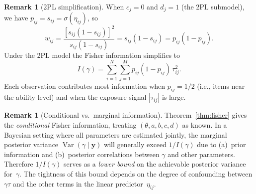 \documentclass[11pt,a4paper]{article}
\theoremstyle{definition}
\newtheorem{remark}[theorem]{Remark}
\DeclareMathOperator{\Var}{Var}
\begin{document}
\begin{remark}[2PL simplification]\label{rem:2pl}
When $c_j = 0$ and $d_j = 1$ (the 2PL submodel), we have
$p_{ij} = s_{ij} = \sigma(\eta_{ij})$, so
\begin{equation}\label{eq:w_2pl}
  w_{ij}
  = \frac{[s_{ij}(1-s_{ij})]^2}{s_{ij}(1-s_{ij})}
  = s_{ij}(1-s_{ij})
  = p_{ij}(1-p_{ij}).
\end{equation}
Under the 2PL model the Fisher information simplifies to
\begin{equation}\label{eq:fisher_2pl}
  I(\gamma)
  = \sum_{i=1}^{N}\sum_{j=1}^{M}
    p_{ij}(1-p_{ij})\,\tau_{ij}^2.
\end{equation}
Each observation contributes most information when $p_{ij} = 1/2$
(i.e., items near the ability level) and when the exposure signal $|\tau_{ij}|$
is large.
\end{remark}


\begin{remark}[Conditional vs.\ marginal information]\label{rem:marginal}
Theorem~\ref{thm:fisher} gives the \emph{conditional} Fisher information,
treating $(\theta, a, b, c, d)$ as known.
In a Bayesian setting where all parameters are estimated jointly,
the marginal posterior variance $\Var(\gamma\mid\mathbf{y})$ will generally
exceed $1/I(\gamma)$ due to (a)~prior information and (b)~posterior correlations
between $\gamma$ and other parameters.
Therefore $1/I(\gamma)$ serves as a \emph{lower bound} on the achievable
posterior variance for~$\gamma$.
The tightness of this bound depends on the degree of confounding between
$\gamma\tau$ and the other terms in the linear predictor~$\eta_{ij}$.
\end{remark}
\end{document}
